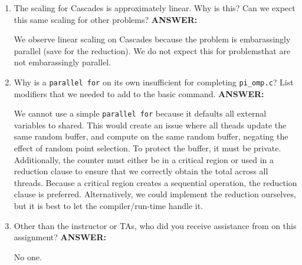 \documentclass[letter]{article}
\begin{document}
\begin{enumerate}
        \item The scaling for Cascades is approximately linear. Why is this? Can we expect this same scaling for other problems?
        \textbf{ANSWER:} %

        We observe linear scaling on Cascades because the problem is embarassingly parallel (save for the reduction).  We do not expect this for problemsthat are not embarassingly parallel.

        \item Why is a \texttt{parallel for} on its own insufficient for completing \texttt{pi\_omp.c}?  List modifiers that we needed to add to the basic command.
        \textbf{ANSWER:} %

        We cannot use a simple \texttt{parallel for} because it defaults all external variables to shared.  This would create an issue where all theads update the same random buffer, and compute on the same random buffer, negating the effect of random point selection.  To protect the buffer, it must be private.  Additionally, the counter must either be in a critical region or used in a reduction clause to ensure that we correctly obtain the total across all threads.  Because a critical region creates a sequential operation, the reduction clause is preferred.  Alternatively, we could implement the reduction ourselves, but it is best to let the compiler/run-time handle it.

        \item Other than the instructor or TAs, who did you receive assistance from on this assignment?
        \textbf{ANSWER:} %
        
        No one.

    \end{enumerate}
\end{document}
